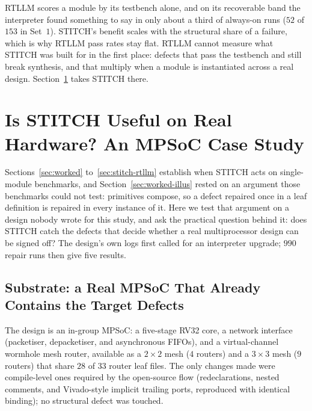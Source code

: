 \documentclass[11pt]{article}
\begin{document}
RTLLM scores a module by its testbench alone, and on its recoverable band the
interpreter found something to say in only about a third of always-on runs
($52$ of $153$ in Set~$1$). STITCH's benefit scales with the structural share
of a failure, which is why RTLLM pass rates stay flat. RTLLM cannot measure
what STITCH was built for in the first place: defects that pass the testbench
and still break synthesis, and that multiply when a module is instantiated
across a real design. Section~\ref{sec:mpsoc} takes STITCH there.

\section{Is STITCH Useful on Real Hardware? An MPSoC Case Study}
\label{sec:mpsoc}

Sections~\ref{sec:worked} to~\ref{sec:stitch-rtllm} establish when STITCH acts
on single-module benchmarks, and Section~\ref{sec:worked-illus} rested on an
argument those benchmarks could not test: primitives compose, so a defect
repaired once in a leaf definition is repaired in every instance of it. Here
we test that argument on a design nobody wrote for this study, and ask the
practical question behind it: does STITCH catch the defects that decide
whether a real multiprocessor design can be signed off? The design's own logs first called for an interpreter upgrade;
$990$ repair runs then give five results.

\subsection{Substrate: a Real MPSoC That Already Contains the Target Defects}
\label{sec:mpsoc-substrate}

The design is an in-group MPSoC: a five-stage RV32 core, a network interface
(packetiser, depacketiser, and asynchronous FIFOs), and a virtual-channel
wormhole mesh router, available as a $2{\times}2$ mesh ($4$ routers) and a
$3{\times}3$ mesh ($9$ routers) that share $28$ of $33$ router leaf files. The
only changes made were compile-level ones required by the open-source flow
(redeclarations, nested comments, and Vivado-style implicit trailing ports,
reproduced with identical binding); no structural defect was touched.
\end{document}
